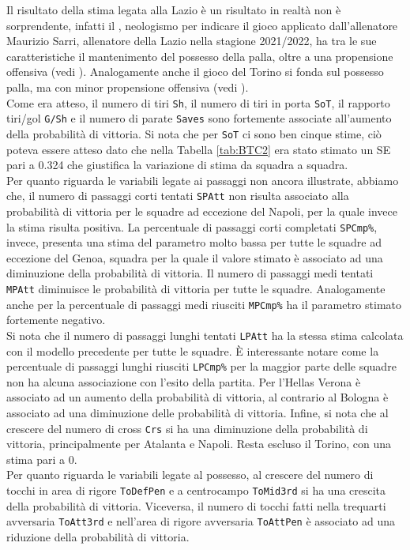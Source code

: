 Il risultato della stima legata alla Lazio è un risultato in realtà non è sorprendente, infatti il \textit{\cite{sarrismotr}}, neologismo per indicare il gioco applicato dall'allenatore Maurizio Sarri, allenatore della Lazio nella stagione 2021/2022, ha tra le sue caratteristiche il mantenimento del possesso della palla, oltre a una propensione offensiva (vedi \textit{\cite{sarrismo}}). Analogamente anche il gioco del Torino si fonda sul possesso palla, ma con minor propensione offensiva (vedi \textit{\cite{torino}}).\\
Come era atteso, il numero di tiri \texttt{Sh}, il numero di tiri in porta \texttt{SoT}, il rapporto tiri/gol \texttt{G/Sh} e il numero di parate \texttt{Saves} sono fortemente associate all'aumento della probabilità di vittoria. Si nota che per \texttt{SoT} ci sono ben cinque stime, ciò poteva essere atteso dato che nella Tabella \ref{tab:BTC2} era stato stimato un SE pari a 0.324 che giustifica la variazione di stima da squadra a squadra. \\
Per quanto riguarda le variabili legate ai passaggi non ancora illustrate, abbiamo che, il numero di passaggi corti tentati \texttt{SPAtt} non risulta associato alla probabilità di vittoria per le squadre ad eccezione del Napoli, per la quale invece la stima risulta positiva. La percentuale di passaggi corti completati \texttt{SPCmp\%}, invece, presenta una stima del parametro molto bassa per tutte le squadre ad eccezione del Genoa, squadra per la quale il valore stimato è associato ad una diminuzione della probabilità di vittoria. Il numero di passaggi medi tentati \texttt{MPAtt} diminuisce le probabilità di vittoria per tutte le squadre. Analogamente anche per la percentuale di passaggi medi riusciti \texttt{MPCmp\%} ha il parametro stimato fortemente negativo.\\
Si nota che il numero di passaggi lunghi tentati \texttt{LPAtt} ha la stessa stima calcolata con il modello precedente per tutte le squadre. È interessante notare come la percentuale di passaggi lunghi riusciti \texttt{LPCmp\%} per la maggior parte delle squadre non ha alcuna associazione con l'esito della partita. Per l'Hellas Verona è associato ad un aumento della probabilità di vittoria, al contrario al Bologna è associato ad una diminuzione delle probabilità di vittoria. Infine, si nota che al crescere del numero di cross \texttt{Crs} si ha una diminuzione della probabilità di vittoria, principalmente per Atalanta e Napoli. Resta escluso il Torino, con una stima pari a 0.\\
Per quanto riguarda le variabili legate al possesso, al crescere del numero di tocchi in area di rigore \texttt{ToDefPen} e a centrocampo \texttt{ToMid3rd} si ha una crescita della probabilità di vittoria. Viceversa, il numero di tocchi fatti nella trequarti avversaria \texttt{ToAtt3rd} e nell'area di rigore avversaria \texttt{ToAttPen} è associato ad una riduzione della probabilità di vittoria.\\

